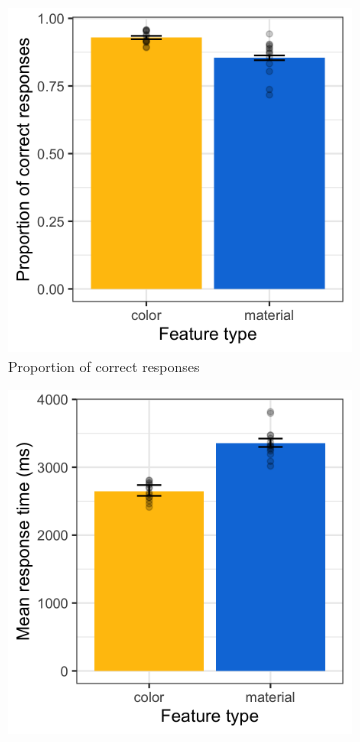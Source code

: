 \documentclass[12pt,letterpaper]{article}
\begin{document}
\begin{figure}[ht]
   \centering
   \begin{subfigure}{.4\textwidth}
   \centering
   \includegraphics[width=\textwidth]{plots/exp3_proportion.png}
   \caption{Proportion of correct responses}
   \label{fig:exp3_a}
   \end{subfigure} \hspace{9mm}
   \begin{subfigure}{.4 \textwidth}
   \centering
   \includegraphics[width=\textwidth]{plots/exp3_rt.png}

\end{subfigure}
\end{figure}
\end{document}

